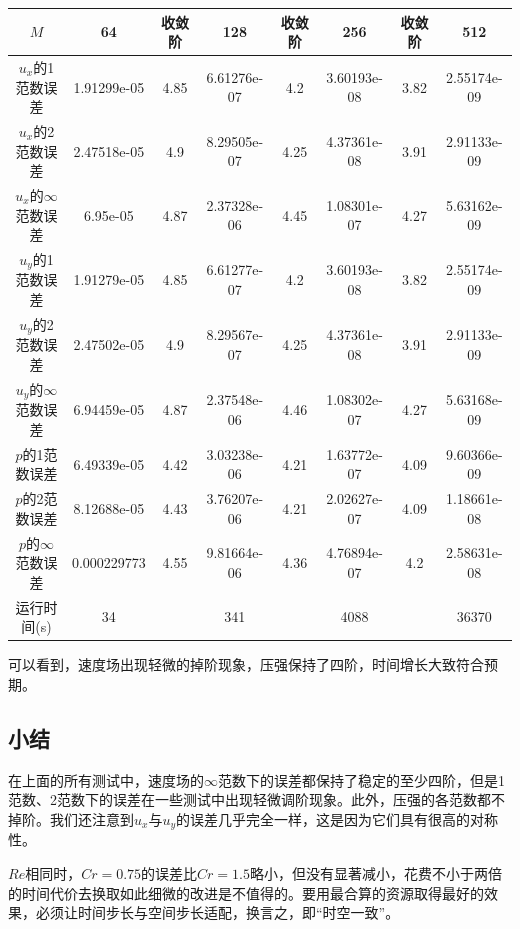 \documentclass[lang=cn,10pt,bibend=bibtex]{elegantbook}
\begin{document}
\begin{table}[H]
  \centering
  \small
  \begin{tabular}{c|ccccccc}
  \textbf{$M$}              & 64          & 收敛阶 & 128         & 收敛阶 & 256         & 收敛阶 & 512   \\ \hline
  $u_x$的1范数误差 & 1.91299e-05 & 4.85 & 6.61276e-07 & 4.2 & 3.60193e-08 & 3.82 & 2.55174e-09\\
  $u_x$的2范数误差 & 2.47518e-05 & 4.9 & 8.29505e-07 & 4.25 & 4.37361e-08 & 3.91 & 2.91133e-09\\
  $u_x$的$\infty$范数误差 & 6.95e-05 & 4.87 & 2.37328e-06 & 4.45 & 1.08301e-07 & 4.27 & 5.63162e-09\\
  $u_y$的1范数误差 & 1.91279e-05 & 4.85 & 6.61277e-07 & 4.2 & 3.60193e-08 & 3.82 & 2.55174e-09\\
  $u_y$的2范数误差 & 2.47502e-05 & 4.9 & 8.29567e-07 & 4.25 & 4.37361e-08 & 3.91 & 2.91133e-09\\
  $u_y$的$\infty$范数误差 & 6.94459e-05 & 4.87 & 2.37548e-06 & 4.46 & 1.08302e-07 & 4.27 & 5.63168e-09\\
  $p$的1范数误差 & 6.49339e-05 & 4.42 & 3.03238e-06 & 4.21 & 1.63772e-07 & 4.09 & 9.60366e-09\\
  $p$的2范数误差 & 8.12688e-05 & 4.43 & 3.76207e-06 & 4.21 & 2.02627e-07 & 4.09 & 1.18661e-08\\
  $p$的$\infty$范数误差 & 0.000229773 & 4.55 & 9.81664e-06 & 4.36 & 4.76894e-07 & 4.2 & 2.58631e-08\\  
  运行时间(s)                &       34     &       &     341      &       &     4088     &       &  36370
  \end{tabular}
\end{table}

可以看到，速度场出现轻微的掉阶现象，压强保持了四阶，时间增长大致符合预期。

\subsection{小结}

在上面的所有测试中，速度场的$\infty$范数下的误差都保持了稳定的至少四阶，但是1范数、2范数下的误差在一些测试中出现轻微调阶现象。此外，压强的各范数都不掉阶。我们还注意到$u_x$与$u_y$的误差几乎完全一样，这是因为它们具有很高的对称性。

$Re$相同时，$Cr=0.75$的误差比$Cr=1.5$略小，但没有显著减小，花费不小于两倍的时间代价去换取如此细微的改进是不值得的。要用最合算的资源取得最好的效果，必须让时间步长与空间步长适配，换言之，即“时空一致”。
\end{document}
